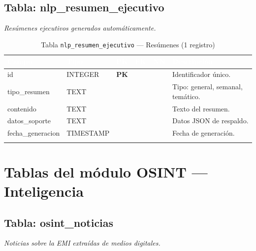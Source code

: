 \documentclass[11pt,a4paper]{article}
\newcommand{\tableheadrow}{\rowcolor{tableheader}}
\newcommand{\tablehead}[1]{\textcolor{white}{\textbf{#1}}}
\newcommand{\pk}{\textcolor{emiblue}{\textbf{PK}}}
\begin{document}
\subsection{Tabla: nlp\_resumen\_ejecutivo}
\textit{Resúmenes ejecutivos generados automáticamente.}

\begin{longtable}{p{4.2cm} p{2.8cm} c c c p{4.5cm}}
\toprule
\tableheadrow
\tablehead{Campo} & \tablehead{Tipo} & \tablehead{PK} & \tablehead{FK} & \tablehead{NN} & \tablehead{Descripción} \\
\midrule
\endhead
id & INTEGER & \pk & & & Identificador único. \\
\rowcolor{tablerow}
tipo\_resumen & TEXT & & & & Tipo: general, semanal, temático. \\
contenido & TEXT & & & & Texto del resumen. \\
\rowcolor{tablerow}
datos\_soporte & TEXT & & & & Datos JSON de respaldo. \\
fecha\_generacion & TIMESTAMP & & & & Fecha de generación. \\
\bottomrule
\caption{Tabla \texttt{nlp\_resumen\_ejecutivo} — Resúmenes (1 registro)}
\end{longtable}

\section{Tablas del módulo OSINT — Inteligencia}

\subsection{Tabla: osint\_noticias}
\textit{Noticias sobre la EMI extraídas de medios digitales.}
\end{document}
